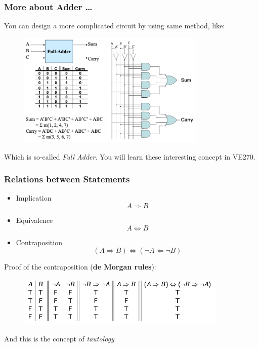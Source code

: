 \documentclass[12pt, t]{beamer}
\renewcommand{\emph}[1]{{\color{Turquoise3}\textsl{#1}}}
\begin{document}
\begin{frame}
    \frametitle{More about Adder \dots}    
You can design a more complicated circuit by using same method, like:
\begin{figure}
    \centering
    \includegraphics[width=9cm]{Figures/FullAdder.png}
\end{figure}
Which is so-called \emph{Full Adder}. You will learn these interesting concept in VE270.
\end{frame}

\begin{frame}
    \frametitle{Relations between Statements}
    \begin{itemize}
        \item Implication
        \begin{equation*}
            A \Rightarrow B
        \end{equation*}
        \item Equivalence
        \begin{equation*}
            A \Leftrightarrow B
        \end{equation*}
        \item Contraposition
        \begin{equation*}
            (A\Rightarrow B) \Leftrightarrow (\neg A \Leftarrow \neg B)
        \end{equation*}
    \end{itemize}
Proof of the contraposition (\textbf{de Morgan rules}):
    \begin{figure}
        \centering
        \includegraphics[width=10cm]{Figures/TruthTable.png}
    \end{figure}
And this is the concept of \emph{tautology}
\end{frame}
\end{document}
